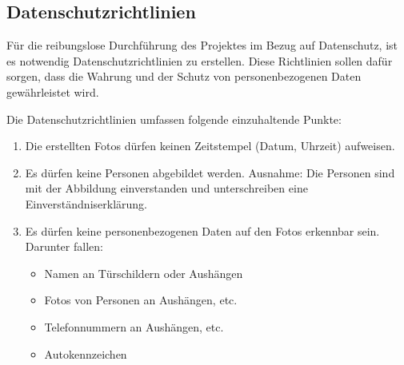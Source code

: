 \subsection{Datenschutzrichtlinien}
\label{sec:Datenschutzrichtlinien}

Für die reibungslose Durchführung des Projektes im Bezug auf Datenschutz, ist es 
notwendig Datenschutzrichtlinien zu erstellen. Diese Richtlinien sollen dafür sorgen, 
dass die Wahrung und der Schutz von personenbezogenen Daten gewährleistet wird.

Die Datenschutzrichtlinien umfassen folgende einzuhaltende Punkte:

\begin{enumerate}
  \item Die erstellten Fotos dürfen keinen Zeitstempel (Datum, Uhrzeit) aufweisen.
  \item Es dürfen keine Personen abgebildet werden. 
  Ausnahme: Die Personen sind mit der Abbildung einverstanden und unterschreiben eine Einverständniserklärung.
  \item Es dürfen keine personenbezogenen Daten auf den Fotos erkennbar sein. Darunter fallen:
  \begin{itemize}
    \item Namen an Türschildern oder Aushängen
    \item Fotos von Personen an Aushängen, etc.
    \item Telefonnummern an Aushängen, etc.
    \item Autokennzeichen
  \end{itemize}
\end{enumerate}